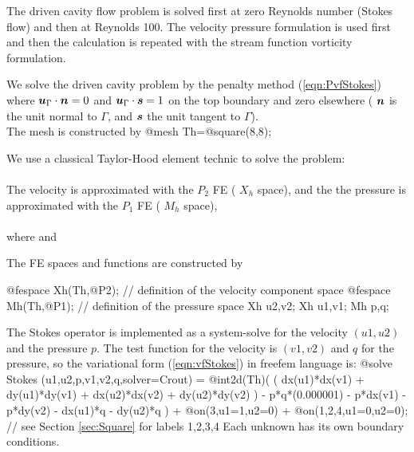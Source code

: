 \documentclass[a4paper,twoside,12pt]{book}
\def\vec#1{\mbox{\boldmath $#1$}}
\def\refSec#1{Section \ref{sec:#1}}
\begin{document}
\begin{example}

The driven cavity flow problem is solved first at zero Reynolds number
(Stokes flow) and then at Reynolds 100.  The
velocity pressure formulation is used first and then the calculation
is repeated with the stream function vorticity formulation.

We solve the driven cavity problem by the penalty method (\ref{eqn:PvfStokes})  where
 $\vec{u}_{\Gamma}\cdot \vec{n}=0$ and $\vec{u}_{\Gamma}\cdot \vec{s}
=1$ on the top boundary and zero elsewhere ( $\vec{n}$ is the unit normal to $\Gamma$, and $\vec{s}$ the unit tangent to $\Gamma$).
\\
The mesh is constructed by
\bFF
@mesh Th=@square(8,8);
\eFF

We use a classical Taylor-Hood element technic to solve the problem:
\\\\
The velocity is approximated with the $P_{2}$ FE ( $X_{h}$ space), and the
the pressure is approximated with the $P_{1}$ FE ( $M_{h}$ space),
\\\\
where
\Blue{
$$  X_{h} = \left\{ \vec{v} \in H^{1}(]0,1[^2) \left|\; \forall K \in \mathcal{T}_{h}
\quad v_{|K} \in
P_{2} \right.\right\}$$} and
\Blue{$$  M_{h} = \left\{ v \in H^{1}(]0,1[^2) \left|\; \forall K \in \mathcal{T}_{h}
\quad v_{|K} \in
P_{1} \right.\right\}$$}

The FE spaces and functions  are constructed by

\bFF
@fespace Xh(Th,@P2); //  definition of the velocity component space
@fespace Mh(Th,@P1);  //  definition of the pressure space
Xh u2,v2;
Xh u1,v1;
Mh p,q;
\eFF

The Stokes operator is implemented as a system-solve for the velocity
$(u1,u2)$ and the pressure $p$.  The test function  for the velocity is $(v1,v2)$
and $q$ for the pressure, so the variational form (\ref{eqn:vfStokes}) in freefem
language is:
\bFF
@solve Stokes (u1,u2,p,v1,v2,q,solver=Crout) =
    @int2d(Th)( ( dx(u1)*dx(v1) + dy(u1)*dy(v1)
            +  dx(u2)*dx(v2) + dy(u2)*dy(v2) )
            - p*q*(0.000001)
            - p*dx(v1) - p*dy(v2)
            - dx(u1)*q - dy(u2)*q
           )
  + @on(3,u1=1,u2=0)
  + @on(1,2,4,u1=0,u2=0); // see \refSec{Square} for labels 1,2,3,4
\eFF
Each unknown has its own boundary conditions.
\\\\


\end{example}
\end{document}

